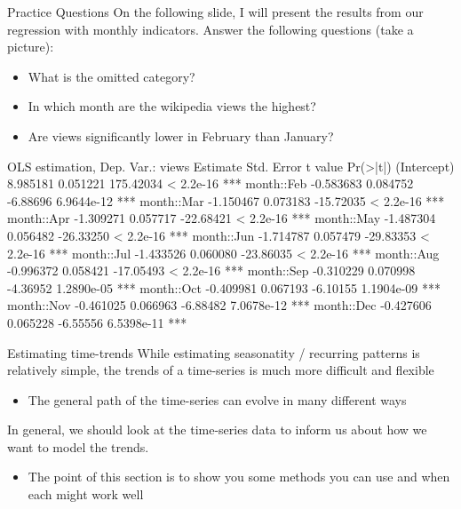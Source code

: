 \documentclass[aspectratio=169,t,11pt,table]{beamer}
\begin{document}

\begin{frame}{Practice Questions}
  On the following slide, I will present the results from our regression with monthly indicators. Answer the following questions (take a picture):
  \begin{itemize}
    \item What is the omitted category?
    
    \item In which month are the wikipedia views the highest?
    
    \item Are views significantly lower in February than January?
  \end{itemize}
\end{frame}

\begin{frame}[fragile]{}
  \begin{codeblockfootnote}[{}]
OLS estimation, Dep. Var.: views 
             Estimate Std. Error   t value   Pr(>|t|)    
(Intercept)  8.985181   0.051221 175.42034  < 2.2e-16 ***
month::Feb  -0.583683   0.084752  -6.88696 6.9644e-12 ***
month::Mar  -1.150467   0.073183 -15.72035  < 2.2e-16 ***
month::Apr  -1.309271   0.057717 -22.68421  < 2.2e-16 ***
month::May  -1.487304   0.056482 -26.33250  < 2.2e-16 ***
month::Jun  -1.714787   0.057479 -29.83353  < 2.2e-16 ***
month::Jul  -1.433526   0.060080 -23.86035  < 2.2e-16 ***
month::Aug  -0.996372   0.058421 -17.05493  < 2.2e-16 ***
month::Sep  -0.310229   0.070998  -4.36952 1.2890e-05 ***
month::Oct  -0.409981   0.067193  -6.10155 1.1904e-09 ***
month::Nov  -0.461025   0.066963  -6.88482 7.0678e-12 ***
month::Dec  -0.427606   0.065228  -6.55556 6.5398e-11 ***
  \end{codeblockfootnote}
\end{frame}




\begin{frame}{Estimating time-trends}
  While estimating seasonatity / recurring patterns is relatively simple, the trends of a time-series is much more difficult and flexible
  \begin{itemize}
    \item The general path of the time-series can evolve in many different ways
  \end{itemize}

  \bigskip
  In general, we should look at the time-series data to inform us about how we want to model the trends. 
  \begin{itemize}
    \item The point of this section is to show you some methods you can use and when each might work well
  \end{itemize}
\end{frame}
\end{document}
